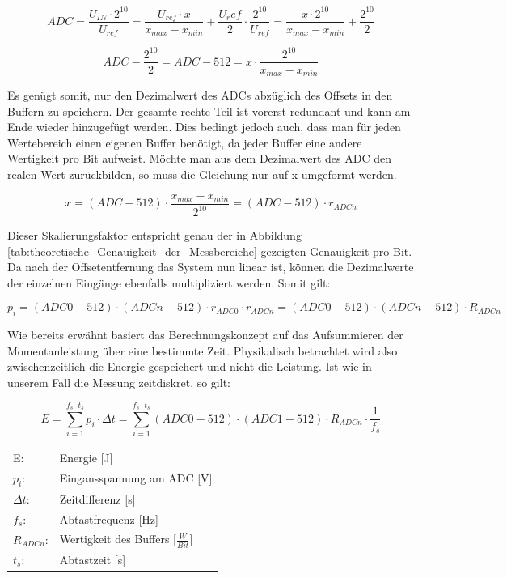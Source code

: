 $$ ADC=\frac{U_{IN} \cdot 2^{10}}{U_{ref}}=\frac{U_{ref} \cdot x}{x_{max} - x_{min}}+\frac{U_ref}{2} \cdot \frac{ 2^{10}}{U_{ref}}=\frac{x \cdot 2^{10}}{x_{max} - x_{min}}+\frac{2^{10}}{2}$$

$$ADC-\frac{2^{10}}{2}=ADC-512=x \cdot \frac{2^{10}}{x_{max} - x_{min}}$$

Es genügt somit, nur den Dezimalwert des ADCs abzüglich des Offsets in den Buffern zu speichern. Der gesamte rechte Teil ist vorerst redundant und kann am Ende wieder hinzugefügt werden. Dies bedingt jedoch auch, dass man für jeden Wertebereich einen eigenen Buffer benötigt, da jeder Buffer eine andere Wertigkeit pro Bit aufweist. Möchte man aus dem Dezimalwert des ADC den realen Wert zurückbilden, so muss die Gleichung nur auf x umgeformt werden.

$$x=(ADC-512)\cdot \frac{x_{max} - x_{min}}{2^{10}}=(ADC-512)\cdot r_{ADCn}$$

Dieser Skalierungsfaktor entspricht genau der in Abbildung \ref{tab:theoretische_Genauigkeit_der_Messbereiche} gezeigten Genauigkeit pro Bit. Da nach der Offsetentfernung das System nun linear ist, können die Dezimalwerte der einzelnen Eingänge ebenfalls multipliziert werden. Somit gilt:

\begin{equation}
p_i=(ADC0-512)\cdot(ADCn -512) \cdot r_{ADC0} \cdot r_{ADCn} = (ADC0-512)\cdot(ADCn -512) \cdot R_{ADCn}
\label{eq:PI}
\end{equation}

Wie bereits erwähnt basiert das Berechnungskonzept auf das Aufsummieren der Momentanleistung über eine bestimmte Zeit. Physikalisch betrachtet wird also zwischenzeitlich die Energie gespeichert und nicht die Leistung. Ist wie in unserem Fall die Messung zeitdiskret, so gilt:

\begin{equation}
E=\sum_{i=1}^{f_s \cdot t_s} p_i \cdot\Delta t = \sum_{i=1}^{f_s \cdot t_s} (ADC0-512)\cdot(ADC1 -512) \cdot R_{ADCn} \cdot \frac{1}{f_s}
\label{eq:E}
\end{equation}

\begin{table}[H]
\begin{tabular}{ll}
E:			&  Energie [J]\\
$p_i$:		&  Eingansspannung am ADC [V]\\
$\Delta t$:	&  Zeitdifferenz [s]\\
$f_s$:		&  Abtastfrequenz [Hz]\\
$ R_{ADCn} $: & Wertigkeit des Buffers [$\frac{W}{Bit}$]\\
$t_s$:		&  Abtastzeit [s]
\end{tabular}
\end{table}

